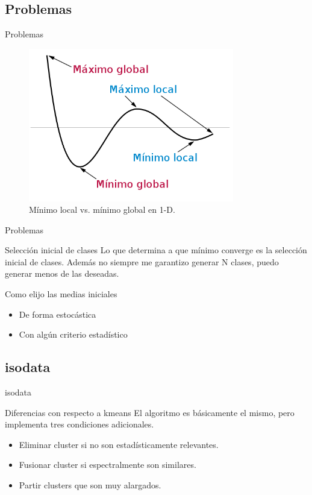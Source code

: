 \documentclass[handout]{beamer}
\begin{document}
\subsection{Problemas}

\begin{frame}{Problemas}
  \begin{figure}
    \includegraphics[width=0.8\textwidth]{imagenes/minimo.png}
    \caption{Mínimo local vs. mínimo global en 1-D.}
  \end{figure}
\end{frame}

\begin{frame}{Problemas}
  \begin{alertblock}{Selección inicial de clases}
    Lo que determina a que mínimo converge es la selección inicial de clases. Además no siempre me garantizo generar N clases, puedo generar menos de las deseadas.
  \end{alertblock}\pause
  \begin{block}{Como elijo las medias iniciales}
    \begin{itemize}[<+>]
      \item De forma estocástica
      \item Con algún criterio estadístico
    \end{itemize}
  \end{block}
\end{frame}

\subsection{isodata}

\begin{frame}{isodata}
  \begin{block}{Diferencias con respecto a kmeans}
    El algoritmo es básicamente el mismo, pero implementa tres condiciones adicionales.
    \begin{itemize}[<+>]
      \item Eliminar cluster si no son estadísticamente relevantes.
      \item Fusionar cluster si espectralmente son similares.
      \item Partir clusters que son muy alargados.
    \end{itemize}
  \end{block}
\end{frame}
\end{document}
